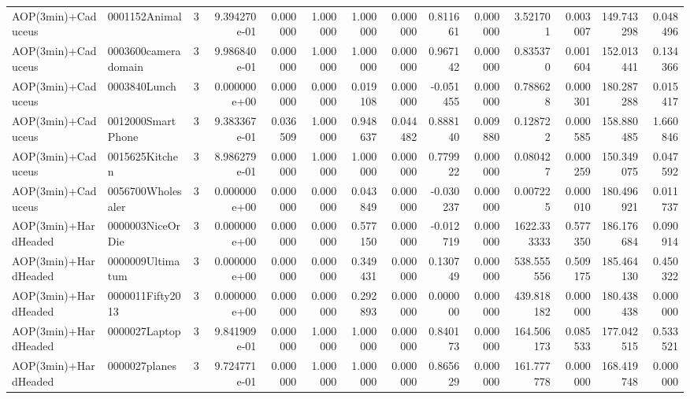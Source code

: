 \begin{tabular}{llrr|r|rr|rr|rr|rrr}
       AOP(3min)+Caduceus &          0001152Animal &       3 & 9.394270e-01 & 0.000000 & 1.000000 &      1.000000 & 0.000000 &      0.811661 & 0.000000 &      3.521701 &    0.003007 &   149.743298 &    0.048496 \\
       AOP(3min)+Caduceus &    0003600cameradomain &       3 & 9.986840e-01 & 0.000000 & 1.000000 &      1.000000 & 0.000000 &      0.967142 & 0.000000 &      0.835370 &    0.001604 &   152.013441 &    0.134366 \\
       AOP(3min)+Caduceus &           0003840Lunch &       3 & 0.000000e+00 & 0.000000 & 0.000000 &      0.019108 & 0.000000 &     -0.051455 & 0.000000 &      0.788628 &    0.000301 &   180.287288 &    0.015417 \\
       AOP(3min)+Caduceus &      0012000SmartPhone &       3 & 9.383367e-01 & 0.036509 & 1.000000 &      0.948637 & 0.044482 &      0.888140 & 0.009880 &      0.128722 &    0.000585 &   158.880485 &    1.660846 \\
       AOP(3min)+Caduceus &         0015625Kitchen &       3 & 8.986279e-01 & 0.000000 & 1.000000 &      1.000000 & 0.000000 &      0.779922 & 0.000000 &      0.080427 &    0.000259 &   150.349075 &    0.047592 \\
       AOP(3min)+Caduceus &      0056700Wholesaler &       3 & 0.000000e+00 & 0.000000 & 0.000000 &      0.043849 & 0.000000 &     -0.030237 & 0.000000 &      0.007225 &    0.000010 &   180.496921 &    0.011737 \\
     AOP(3min)+HardHeaded &       0000003NiceOrDie &       3 & 0.000000e+00 & 0.000000 & 0.000000 &      0.577150 & 0.000000 &     -0.012719 & 0.000000 &   1622.333333 &    0.577350 &   186.176684 &    0.090914 \\
     AOP(3min)+HardHeaded &       0000009Ultimatum &       3 & 0.000000e+00 & 0.000000 & 0.000000 &      0.349431 & 0.000000 &      0.130749 & 0.000000 &    538.555556 &    0.509175 &   185.464130 &    0.450322 \\
     AOP(3min)+HardHeaded &       0000011Fifty2013 &       3 & 0.000000e+00 & 0.000000 & 0.000000 &      0.292893 & 0.000000 &      0.000000 & 0.000000 &    439.818182 &    0.000000 &   180.438438 &    0.000000 \\
     AOP(3min)+HardHeaded &          0000027Laptop &       3 & 9.841909e-01 & 0.000000 & 1.000000 &      1.000000 & 0.000000 &      0.840173 & 0.000000 &    164.506173 &    0.085533 &   177.042515 &    0.533521 \\
     AOP(3min)+HardHeaded &          0000027planes &       3 & 9.724771e-01 & 0.000000 & 1.000000 &      1.000000 & 0.000000 &      0.865629 & 0.000000 &    161.777778 &    0.000000 &   168.419748 &    0.000000 \\

\end{tabular}
